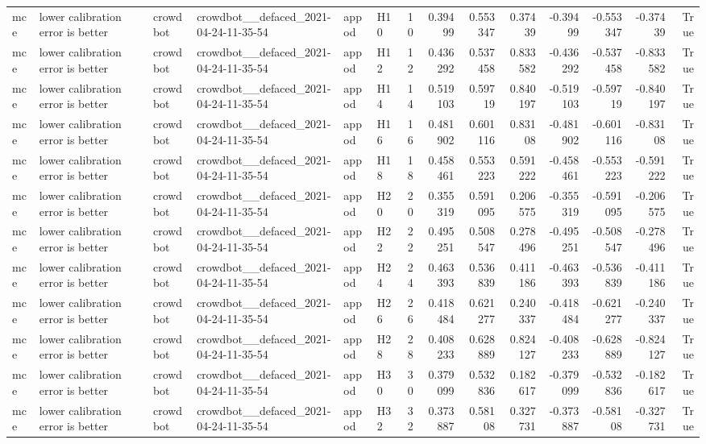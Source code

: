 \begin{longtable}{llllllrrrrrrrr}
mce & lower calibration error is better & crowdbot & crowdbot\_\_defaced\_2021-04-24-11-35-54 & appod & H10 & 10 & 0.39499 & 0.553347 & 0.37439 & -0.39499 & -0.553347 & -0.37439 & True \\
mce & lower calibration error is better & crowdbot & crowdbot\_\_defaced\_2021-04-24-11-35-54 & appod & H12 & 12 & 0.436292 & 0.537458 & 0.833582 & -0.436292 & -0.537458 & -0.833582 & True \\
mce & lower calibration error is better & crowdbot & crowdbot\_\_defaced\_2021-04-24-11-35-54 & appod & H14 & 14 & 0.519103 & 0.59719 & 0.840197 & -0.519103 & -0.59719 & -0.840197 & True \\
mce & lower calibration error is better & crowdbot & crowdbot\_\_defaced\_2021-04-24-11-35-54 & appod & H16 & 16 & 0.481902 & 0.601116 & 0.83108 & -0.481902 & -0.601116 & -0.83108 & True \\
mce & lower calibration error is better & crowdbot & crowdbot\_\_defaced\_2021-04-24-11-35-54 & appod & H18 & 18 & 0.458461 & 0.553223 & 0.591222 & -0.458461 & -0.553223 & -0.591222 & True \\
mce & lower calibration error is better & crowdbot & crowdbot\_\_defaced\_2021-04-24-11-35-54 & appod & H20 & 20 & 0.355319 & 0.591095 & 0.206575 & -0.355319 & -0.591095 & -0.206575 & True \\
mce & lower calibration error is better & crowdbot & crowdbot\_\_defaced\_2021-04-24-11-35-54 & appod & H22 & 22 & 0.495251 & 0.508547 & 0.278496 & -0.495251 & -0.508547 & -0.278496 & True \\
mce & lower calibration error is better & crowdbot & crowdbot\_\_defaced\_2021-04-24-11-35-54 & appod & H24 & 24 & 0.463393 & 0.536839 & 0.411186 & -0.463393 & -0.536839 & -0.411186 & True \\
mce & lower calibration error is better & crowdbot & crowdbot\_\_defaced\_2021-04-24-11-35-54 & appod & H26 & 26 & 0.418484 & 0.621277 & 0.240337 & -0.418484 & -0.621277 & -0.240337 & True \\
mce & lower calibration error is better & crowdbot & crowdbot\_\_defaced\_2021-04-24-11-35-54 & appod & H28 & 28 & 0.408233 & 0.628889 & 0.824127 & -0.408233 & -0.628889 & -0.824127 & True \\
mce & lower calibration error is better & crowdbot & crowdbot\_\_defaced\_2021-04-24-11-35-54 & appod & H30 & 30 & 0.379099 & 0.532836 & 0.182617 & -0.379099 & -0.532836 & -0.182617 & True \\
mce & lower calibration error is better & crowdbot & crowdbot\_\_defaced\_2021-04-24-11-35-54 & appod & H32 & 32 & 0.373887 & 0.58108 & 0.327731 & -0.373887 & -0.58108 & -0.327731 & True \\

\end{longtable}
